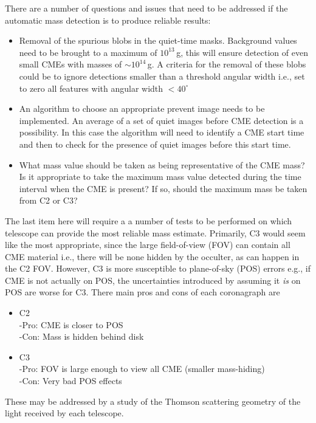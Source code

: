 There are a number of questions and issues that need to be addressed if the automatic mass detection is to produce reliable results:
\begin{itemize}
\item Removal of the spurious blobs in the quiet-time masks. Background values need to be brought to a maximum of $10^{13}$\,g, this will ensure detection of even small CMEs with masses of $\sim$$10^{14}$\,g. A criteria for the removal of these blobs could be to ignore detections smaller than a threshold angular width i.e., set to zero all features with angular width $<40^{\circ}$
\item An algorithm to choose an appropriate prevent image needs to be implemented. An average of a set of quiet images before CME detection is a possibility. In this case the algorithm will need to identify a CME start time and then to check for the presence of quiet images before this start time. 
\item What mass value should be taken as being representative of the CME mass? Is it appropriate to take the maximum mass value detected during the time interval when the CME is present? If so, should the maximum mass be taken from C2 or C3?
\end{itemize}
The last item here will require a a number of tests to be performed on which telescope can provide the most reliable mass estimate. Primarily, C3 would seem like the most appropriate, since the large field-of-view (FOV) can contain all CME material i.e., there will be none hidden by the occulter, as can happen in the C2 FOV. However, C3 is more susceptible to plane-of-sky (POS) errors e.g., if CME is not actually on POS, the uncertainties introduced by assuming it \emph{is} on POS are worse for C3. There main pros and cons of each coronagraph are
\begin{itemize}
\item C2 \hfill \\
-Pro: CME is closer to POS \\
-Con: Mass is hidden behind disk
\item C3 \hfill \\
-Pro: FOV is large enough to view all CME (smaller mass-hiding)\\ 
-Con: Very bad POS effects
\end{itemize}
These may be addressed by a study of the Thomson scattering geometry of the light received by each telescope.

